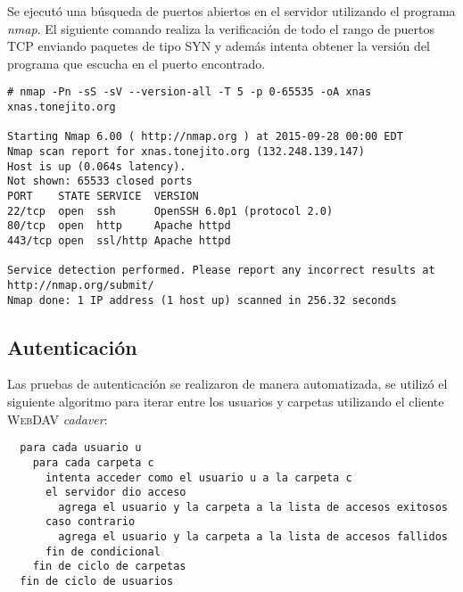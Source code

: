 Se ejecut\'{o} una b\'{u}squeda de puertos abiertos en el servidor utilizando el programa \emph{nmap}. El siguiente comando realiza la verificaci\'{o}n de todo el rango de puertos \textsc{TCP} enviando paquetes de tipo \textsc{SYN} y adem\'{a}s intenta obtener la versi\'{o}n del programa que escucha en el puerto encontrado.


{
\scriptsize
\linespread{1}
\begin{verbatim}
# nmap -Pn -sS -sV --version-all -T 5 -p 0-65535 -oA xnas xnas.tonejito.org

Starting Nmap 6.00 ( http://nmap.org ) at 2015-09-28 00:00 EDT
Nmap scan report for xnas.tonejito.org (132.248.139.147)
Host is up (0.064s latency).
Not shown: 65533 closed ports
PORT    STATE SERVICE  VERSION
22/tcp  open  ssh      OpenSSH 6.0p1 (protocol 2.0)
80/tcp  open  http     Apache httpd
443/tcp open  ssl/http Apache httpd

Service detection performed. Please report any incorrect results at http://nmap.org/submit/
Nmap done: 1 IP address (1 host up) scanned in 256.32 seconds
\end{verbatim}
}


      \subsection {Autenticaci\'{o}n}

Las pruebas de autenticaci\'{o}n se realizaron de manera automatizada, se utiliz\'{o} el siguiente algoritmo para iterar entre los usuarios y carpetas utilizando el cliente \textsc{WebDAV} \textsl{cadaver}:

{
\scriptsize
\linespread{1}
\begin{verbatim}
  para cada usuario u
    para cada carpeta c
      intenta acceder como el usuario u a la carpeta c
      el servidor dio acceso
        agrega el usuario y la carpeta a la lista de accesos exitosos
      caso contrario
        agrega el usuario y la carpeta a la lista de accesos fallidos
      fin de condicional
    fin de ciclo de carpetas
  fin de ciclo de usuarios
\end{verbatim}
}

